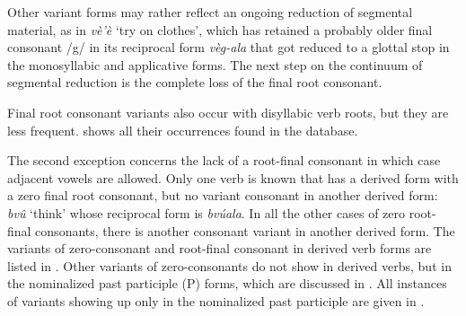 Other variant forms may rather reflect an ongoing reduction of segmental material, as in {\itshape vè'è} `try on clothes', which has retained a probably older final consonant /g/ in its reciprocal form {\itshape vèg-ala} that got reduced to a glottal stop in the monosyllabic and applicative forms. The next step on the continuum of segmental reduction is the complete loss of the final root consonant.

Final root consonant variants also occur with disyllabic verb roots, but they are less frequent.  shows all their occurrences found in the database.

\begin{table}
\caption{Root-final consonant variants (disyllabic verbs)}
\label{Tab:RFCVbi}
\end{table} 


The second exception concerns the lack of a root-final consonant in which case adjacent vowels are allowed. Only one verb is known that has a derived form with a zero final root consonant, but no variant consonant in another derived form: {\itshape bvû} `think' whose reciprocal form is {\itshape bvúala}.
In all the other cases of zero root-final consonants, there is another consonant variant in another derived form. The variants of zero-consonant and root-final consonant in derived verb forms are listed in . Other variants of zero-consonants do not show in derived verbs, but in the nominalized past participle ({\NP}P) forms, which are discussed in . All instances  of variants showing up only in the nominalized past participle are given in .


